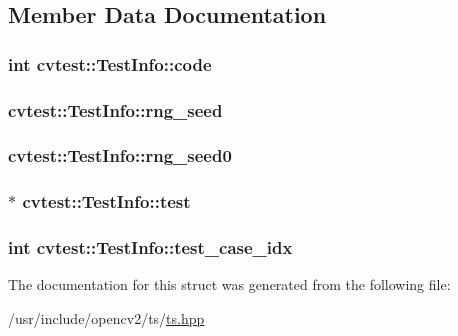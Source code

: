 \subsection{Member Data Documentation}
\hypertarget{structcvtest_1_1TestInfo_a4fc014e932686937f7fbea569f08f956}{
\subsubsection[{code}]{\setlength{\rightskip}{0pt plus 5cm}int cvtest\-::\-Test\-Info\-::code}}\label{structcvtest_1_1TestInfo_a4fc014e932686937f7fbea569f08f956}
\hypertarget{structcvtest_1_1TestInfo_a9ca8f703f0cae481c787fe421772dcb7}{
\subsubsection[{rng\-\_\-seed}]{ cvtest\-::\-Test\-Info\-::rng\-\_\-seed}}\label{structcvtest_1_1TestInfo_a9ca8f703f0cae481c787fe421772dcb7}
\hypertarget{structcvtest_1_1TestInfo_a767eb110885736eb548ec27b138d8664}{
\subsubsection[{rng\-\_\-seed0}]{ cvtest\-::\-Test\-Info\-::rng\-\_\-seed0}}\label{structcvtest_1_1TestInfo_a767eb110885736eb548ec27b138d8664}
\hypertarget{structcvtest_1_1TestInfo_a8853c7f79dd9c744b3d71b5d74698c7b}{
\subsubsection[{test}]{$\ast$ cvtest\-::\-Test\-Info\-::test}}\label{structcvtest_1_1TestInfo_a8853c7f79dd9c744b3d71b5d74698c7b}
\hypertarget{structcvtest_1_1TestInfo_a30af82d049723a3f82baa28b0fd9c26b}{
\subsubsection[{test\-\_\-case\-\_\-idx}]{\setlength{\rightskip}{0pt plus 5cm}int cvtest\-::\-Test\-Info\-::test\-\_\-case\-\_\-idx}}\label{structcvtest_1_1TestInfo_a30af82d049723a3f82baa28b0fd9c26b}


The documentation for this struct was generated from the following file\-:\begin{DoxyCompactItemize}
\item 
/usr/include/opencv2/ts/\hyperlink{ts_8hpp}{ts.\-hpp}\end{DoxyCompactItemize}
